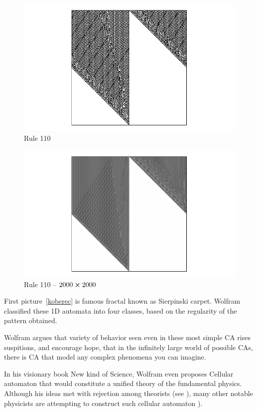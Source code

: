 \begin{figure}
 \centering
 \includegraphics[trim = 40mm 0mm 0mm 0mm, width=1.7\textwidth]{./img/110_500}
 \caption{Rule 110}
\end{figure}

\begin{figure}
 \centering
 \includegraphics[trim = 40mm 0mm 0mm 0mm, width=1.7\textwidth]{./img/110_2000}
 \caption{Rule 110 -- $2000 \cross 2000$}
\end{figure}



First picture~\ref{koberec} is famous fractal known as Sierpinski carpet. Wolfram classified these 1D automata into four classes, based on the regularity of the pattern obtained.

Wolfram argues that variety of behavior seen even in these most simple CA rises suspitions, and encourage hope, that in the infinitely large world of possible CAs, there is CA that model any complex phenomena you can imagine.

In his visionary book New kind of Science, Wolfram even proposes Cellular automaton that would constitute a unified theory of the fundamental physics.
Although his ideas met with rejection among theorists (see \cite{aaronson}),
many other notable physicists are attempting to construct such cellular automaton \cite{hooft}).

